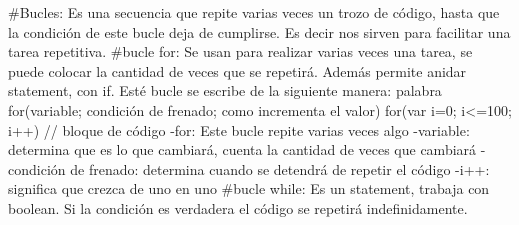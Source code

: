 #Bucles: Es una secuencia que repite varias veces un trozo de código, hasta que la condición de este bucle
deja de cumplirse. Es decir nos sirven para facilitar una tarea repetitiva. 
#bucle for: Se usan para realizar varias veces una tarea, se puede colocar la cantidad de veces que se 
repetirá. Además permite anidar statement, con if. 
Esté bucle se escribe de la siguiente manera:
palabra for(variable; condición de frenado; como incrementa el valor) 
               for(var i=0; i<=100; i++)
               // bloque de código
-for: Este bucle repite varias veces algo
 -variable: determina que es lo que cambiará, cuenta la cantidad de veces que cambiará
 -condición de frenado: determina cuando se detendrá de repetir el código
 -i++: significa que crezca de uno en uno
#bucle while: Es un statement, trabaja con boolean. Si la condición es verdadera el código se repetirá 
indefinidamente.


